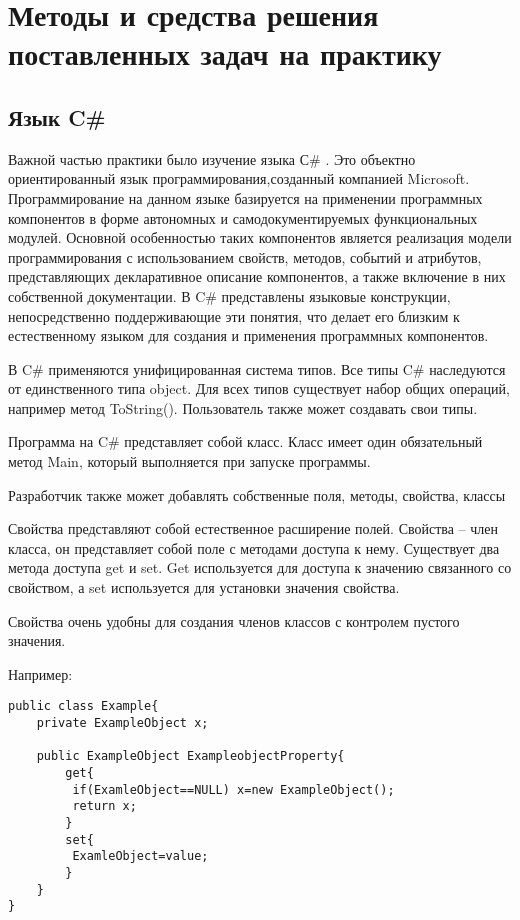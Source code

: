 \section{Методы и средства решения поставленных задач на практику}
\subsection{Язык C\#}
Важной частью практики было изучение языка С\# .  Это объектно ориентированный язык программирования,созданный компанией Microsoft.  Программирование на данном языке базируется на применении программных компонентов в форме автономных и самодокументируемых функциональных модулей. Основной особенностью таких компонентов является реализация модели программирования с использованием свойств, методов, событий и атрибутов, представляющих декларативное описание компонентов, а также включение в них собственной документации. В C\# представлены языковые конструкции, непосредственно поддерживающие эти понятия, что делает его близким к естественному языком для создания и применения программных компонентов.

В C\# применяются унифицированная система типов. Все типы C\# наследуются от единственного типа object. Для всех типов существует набор общих операций, например метод ToString(). Пользователь также может создавать свои типы.

Программа на C\# представляет собой класс. Класс имеет один обязательный метод Main, который выполняется при запуске программы. 

Разработчик также может добавлять собственные поля, методы, свойства, классы

Свойства представляют собой естественное расширение полей. Свойства -- член класса, он представляет собой поле с методами доступа к нему. Существует два метода доступа get и set. Get используется для доступа к значению связанного со свойством, а set используется для установки значения свойства.

Свойства очень удобны для создания членов классов с контролем пустого значения. 

\noindent Например:
\lstset{
extendedchars=\true,
inputencoding=utf8,
language=[Sharp]c
}
\begin{lstlisting}
public class Example{
	private	ExampleObject x;

	public ExampleObject ExampleobjectProperty{
		get{
		 if(ExamleObject==NULL) x=new ExampleObject();
		 return x;
		}
		set{
		 ExamleObject=value;
		}	
	}
}
\end{lstlisting}

